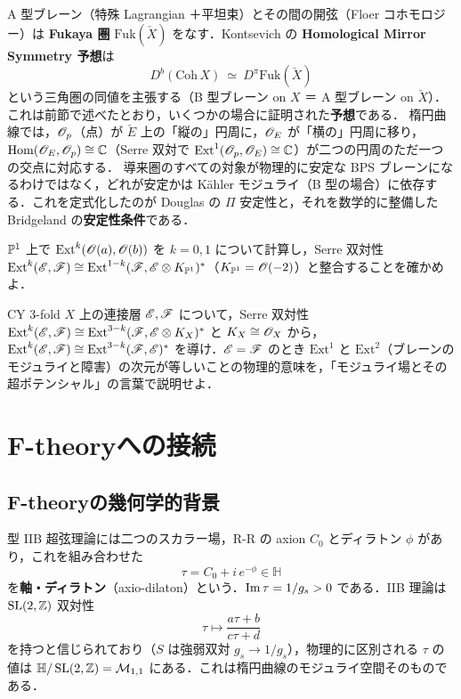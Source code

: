 \begin{physbox}
A 型ブレーン（特殊 Lagrangian ＋平坦束）とその間の開弦（Floer コホモロジー）は \textbf{Fukaya 圏} $\mathrm{Fuk}(\check X)$ をなす．Kontsevich の \textbf{Homological Mirror Symmetry 予想}は
\[
D^b(\mathrm{Coh}\,X)\ \simeq\ D^\pi\mathrm{Fuk}(\check X)
\]
という三角圏の同値を主張する（B 型ブレーン on $X$ ＝ A 型ブレーン on $\check X$）．これは前節で述べたとおり，いくつかの場合に証明された\textbf{予想}である．
楕円曲線では，$\mathscr{O}_p$（点）が $\check E$ 上の「縦の」円周に，$\mathscr{O}_E$ が「横の」円周に移り，$\operatorname{Hom}(\mathscr{O}_E,\mathscr{O}_p)\cong\mathbb{C}$（Serre 双対で $\mathrm{Ext}^1(\mathscr{O}_p,\mathscr{O}_E)\cong\mathbb{C}$）が二つの円周のただ一つの交点に対応する．
導来圏のすべての対象が物理的に安定な BPS ブレーンになるわけではなく，どれが安定かは K\"ahler モジュライ（B 型の場合）に依存する．これを定式化したのが Douglas の $\Pi$ 安定性と，それを数学的に整備した Bridgeland の\textbf{安定性条件}である．
\end{physbox}

$\mathbb{P}^1$ 上で $\mathrm{Ext}^k(\mathscr{O}(a),\mathscr{O}(b))$ を $k=0,1$ について計算し，Serre 双対性 $\mathrm{Ext}^k(\mathscr{E},\mathscr{F})\cong\mathrm{Ext}^{1-k}(\mathscr{F},\mathscr{E}\otimes K_{\mathbb{P}^1})^*$（$K_{\mathbb{P}^1}=\mathscr{O}(-2)$）と整合することを確かめよ．

CY 3-fold $X$ 上の連接層 $\mathscr{E},\mathscr{F}$ について，Serre 双対性 $\mathrm{Ext}^k(\mathscr{E},\mathscr{F})\cong\mathrm{Ext}^{3-k}(\mathscr{F},\mathscr{E}\otimes K_X)^*$ と $K_X\cong\mathscr{O}_X$ から，$\mathrm{Ext}^k(\mathscr{E},\mathscr{F})\cong\mathrm{Ext}^{3-k}(\mathscr{F},\mathscr{E})^*$ を導け．$\mathscr{E}=\mathscr{F}$ のとき $\mathrm{Ext}^1$ と $\mathrm{Ext}^2$（ブレーンのモジュライと障害）の次元が等しいことの物理的意味を，「モジュライ場とその超ポテンシャル」の言葉で説明せよ．

\section{F-theoryへの接続}

\subsection{F-theoryの幾何学的背景}

型 IIB 超弦理論には二つのスカラー場，R-R の axion $C_0$ とディラトン $\phi$ があり，これを組み合わせた
\begin{equation}
\tau=C_0+i\,e^{-\phi}\in\mathbb{H}
\label{eq:ch17-axio-dilaton}
\end{equation}
を\textbf{軸・ディラトン}（axio-dilaton）という．$\operatorname{Im}\tau=1/g_s>0$ である．IIB 理論は $\operatorname{SL}(2,\mathbb{Z})$ 双対性
\[
\tau\mapsto\frac{a\tau+b}{c\tau+d}
\]
を持つと信じられており（$S$ は強弱双対 $g_s\to1/g_s$），物理的に区別される $\tau$ の値は $\mathbb{H}/\operatorname{SL}(2,\mathbb{Z})=\mathcal{M}_{1,1}$ にある．これは楕円曲線のモジュライ空間そのものである．

